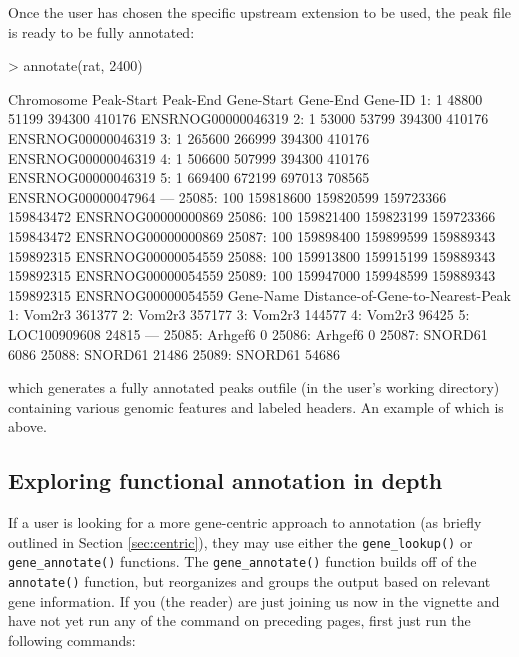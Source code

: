 \documentclass[12pt]{article}
\begin{document}
Once the user has chosen the specific upstream extension to be used, the peak file is ready to be fully annotated:

\begin{Schunk}
\begin{Sinput}
> annotate(rat, 2400)
\end{Sinput}
\begin{Soutput}
       Chromosome Peak-Start  Peak-End Gene-Start  Gene-End            Gene-ID
    1:          1      48800     51199     394300    410176 ENSRNOG00000046319
    2:          1      53000     53799     394300    410176 ENSRNOG00000046319
    3:          1     265600    266999     394300    410176 ENSRNOG00000046319
    4:          1     506600    507999     394300    410176 ENSRNOG00000046319
    5:          1     669400    672199     697013    708565 ENSRNOG00000047964
   ---                                                                        
25085:        100  159818600 159820599  159723366 159843472 ENSRNOG00000000869
25086:        100  159821400 159823199  159723366 159843472 ENSRNOG00000000869
25087:        100  159898400 159899599  159889343 159892315 ENSRNOG00000054559
25088:        100  159913800 159915199  159889343 159892315 ENSRNOG00000054559
25089:        100  159947000 159948599  159889343 159892315 ENSRNOG00000054559
          Gene-Name Distance-of-Gene-to-Nearest-Peak
    1:       Vom2r3                           361377
    2:       Vom2r3                           357177
    3:       Vom2r3                           144577
    4:       Vom2r3                            96425
    5: LOC100909608                            24815
   ---                                              
25085:      Arhgef6                                0
25086:      Arhgef6                                0
25087:      SNORD61                             6086
25088:      SNORD61                            21486
25089:      SNORD61                            54686
\end{Soutput}
\end{Schunk}

which generates a fully annotated peaks outfile (in the user's working directory) containing various genomic features and labeled headers. An example of which is above.

\subsection{Exploring functional annotation in depth}

If a user is looking for a more gene-centric approach to an\-notation (as briefly outlined in Section \ref{sec:centric}), they may use either the \texttt{gene\_lookup()}
or \texttt{gene\_annotate()} functions. The \texttt{gene\_annotate()} function builds off of the \texttt{annotate()} function, but reorganizes and groups the output based on relevant gene information.  If you (the reader) are just joining us now in the vignette and have not yet run any of the command on preceding pages, first just run the following commands:
\end{document}
